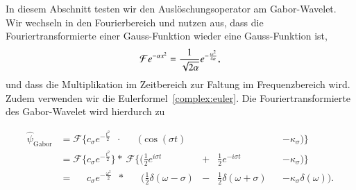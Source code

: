 In diesem Abschnitt testen wir den Auslöschungsoperator am Gabor-Wavelet.
Wir wechseln in den Fourierbereich und nutzen aus, dass die Fouriertransformierte einer Gauss-Funktion wieder eine Gauss-Funktion ist,
\[
	\Four e^{-\alpha x^2} 
	= \frac{1}{\sqrt{2\alpha}}e^{- \frac{\omega^2}{4\alpha}},
\]
und dass die Multiplikation im Zeitbereich zur Faltung im Frequenzbereich wird.
Zudem verwenden wir die Eulerformel~\eqref{complex:euler}.
Die Fouriertransformierte des Gabor-Wavelet wird hierdurch zu

\begin{equation*}
\begin{aligned}
 \hat{\psi}_\text{Gabor}
 & = \mathcal{F}\Bigg\lbrace c_\sigma e^{-\frac{t^2}{2}}\phantom{\Bigg\rbrace}
 \cdot\; \phantom{\mathcal{F}\Bigg\lbrace}
 \Bigg(\cos\left(\sigma t\right) &&
 &&- \kappa_\sigma\Bigg) \Bigg\rbrace \\
 & = \mathcal{F}\Bigg\lbrace c_\sigma e^{-\frac{t^2}{2}} \Bigg\rbrace 
 *\: \mathcal{F}\Bigg\lbrace\Bigg( \frac12 e^{i\sigma t} &+& \frac12 e^{-i\sigma t}
 &&- \kappa_\sigma \Bigg)\Bigg\rbrace\\
 & = \phantom{\mathcal{F}\Bigg\lbrace} c_\sigma e^{- \frac{\omega^2}{2}} \phantom{\Big\rbrace}
 *\:\phantom{\mathcal{F}\Bigg\lbrace} \Bigg(
  \frac{1}{2}\delta(\omega - \sigma) &-&
  \frac{1}{2}\delta(\omega + \sigma) 
 && - \kappa_\sigma\delta(\omega)
  \Bigg).
\end{aligned}
\end{equation*}

